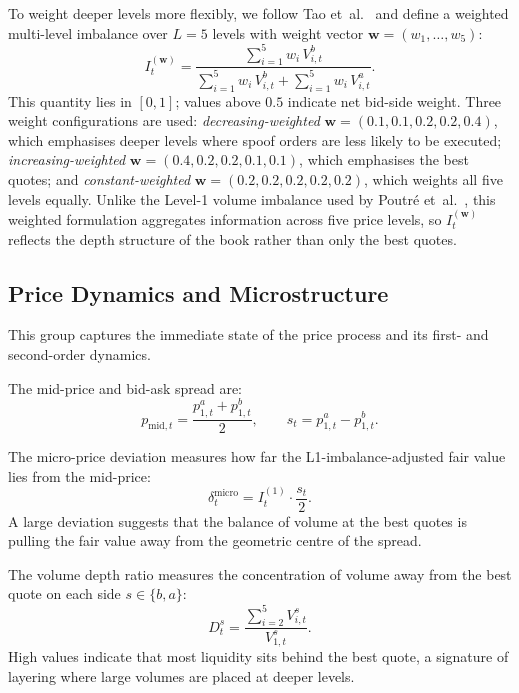 \documentclass[11pt]{report}
\begin{document}
To weight deeper levels more flexibly, we follow Tao et~al.~\cite{tao_2020} and define a weighted multi-level imbalance over $L = 5$ levels with weight vector $\mathbf{w} = (w_1, \ldots, w_5)$:
\begin{equation}
  \label{eq:weighted_imbalance}
  I^{(\mathbf{w})}_t = \frac{\sum_{i=1}^{5} w_i \, V^b_{i,t}}{\sum_{i=1}^{5} w_i \, V^b_{i,t} + \sum_{i=1}^{5} w_i \, V^a_{i,t}}.
\end{equation}
This quantity lies in $[0, 1]$; values above $0.5$ indicate net bid-side weight. Three weight configurations are used: \emph{decreasing-weighted} $\mathbf{w} = (0.1, 0.1, 0.2, 0.2, 0.4)$, which emphasises deeper levels where spoof orders are less likely to be executed; \emph{increasing-weighted} $\mathbf{w} = (0.4, 0.2, 0.2, 0.1, 0.1)$, which emphasises the best quotes; and \emph{constant-weighted} $\mathbf{w} = (0.2, 0.2, 0.2, 0.2, 0.2)$, which weights all five levels equally. Unlike the Level-1 volume imbalance used by Poutr\'e et~al.~\cite{poutre_2024}, this weighted formulation aggregates information across five price levels, so $I^{(\mathbf{w})}_t$ reflects the depth structure of the book rather than only the best quotes.


\subsection{Price Dynamics and Microstructure}\label{subsec:features:price}

This group captures the immediate state of the price process and its first- and second-order dynamics.

The mid-price and bid-ask spread are:
\begin{equation}
  \label{eq:midprice}
  p_{\text{mid},t} = \frac{p^a_{1,t} + p^b_{1,t}}{2}, \qquad
  s_t = p^a_{1,t} - p^b_{1,t}.
\end{equation}

The micro-price deviation measures how far the L1-imbalance-adjusted fair value lies from the mid-price:
\begin{equation}
  \label{eq:microprice_deviation}
  \delta_t^{\text{micro}} = I^{(1)}_t \cdot \frac{s_t}{2}.
\end{equation}
A large deviation suggests that the balance of volume at the best quotes is pulling the fair value away from the geometric centre of the spread.

The volume depth ratio measures the concentration of volume away from the best quote on each side $s \in \{b, a\}$:
\begin{equation}
  \label{eq:depth_ratio}
  D^s_t = \frac{\sum_{i=2}^{5} V^s_{i,t}}{V^s_{1,t}}.
\end{equation}
High values indicate that most liquidity sits behind the best quote, a signature of layering where large volumes are placed at deeper levels.
\end{document}
